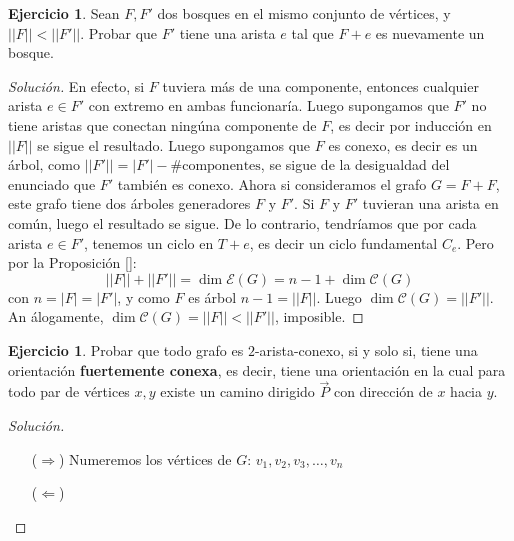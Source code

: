 \documentclass[12pt]{report}
\theoremstyle{plain}
\theoremstyle{definition}
\newtheorem{exercise}[theorem]{Ejercicio}
\newenvironment{solution}{\begin{proof}[Solución]}{\end{proof}}
\newcommand{\abs}[1]{\left \vert #1 \right \vert}
\newcommand{\Abs}[1]{\left \vert \left \vert #1 \right \vert \right \vert}
\begin{document}
\begin{exercise}
Sean $F,F'$ dos bosques en el mismo conjunto de vértices, y $\Abs F < \Abs  {F'}$. Probar que $F'$ tiene una arista $
e$ tal que $F + e$ es nuevamente un bosque.
\end{exercise}
\begin{solution}
    En efecto, si $F$ tuviera más de una componente, entonces cualquier arista $e \in F'$ con extremo en ambas
    funcionaría. Luego supongamos que $F'$ no tiene aristas que conectan ningúna componente de $F$, es decir por
    inducción en $\Abs F$ se sigue el resultado. Luego supongamos que $F$ es conexo, es decir es un árbol, como $\Abs {F'} = \abs {F'}- \# \text{componentes}$, se sigue de la desigualdad del enunciado que $F'$ también es conexo. Ahora si consideramos el grafo $G = F + F$, este grafo tiene dos árboles generadores $F$ y $F'$. Si $F$ y $F'$ tuvieran una arista en común, luego el resultado se sigue. De lo contrario, tendríamos que por cada arista $e \in F'$, tenemos un ciclo en $T+e$, es decir un ciclo fundamental $C_e$. Pero por la Proposición \ref{}:
    \[
    \Abs F + \Abs {F'} = \dim \mathcal E (G) = n -1 + \dim \mathcal C (G)
    \]
    con $n = \abs F = \abs {F'}$, y como $F$ es árbol $n-1 = \Abs F$. Luego $\dim \mathcal C (G) = \Abs {F'}$. An
    álogamente, $\dim \mathcal C (G) = \Abs {F} < \Abs {F'}$, imposible.
\end{solution}

\begin{exercise}
    Probar que todo grafo es $2$-arista-conexo, si y solo si, tiene una orientación \textbf{fuertemente conexa}, es
    decir, tiene una orientación en la cual para todo par de vértices $x,y$ existe un camino dirigido $\overset{
    \rightarrow}{P}$ con dirección de $x$ hacia $y$.
\end{exercise}
\begin{solution}
    \begin{enumerate}
    \item[($\Rightarrow$)] Numeremos los vértices de $G$: $v_{1},v_2, v_3,\ldots, v_n$
    \item[($\Leftarrow$)]
    \end{enumerate}
\end{solution}
\end{document}
